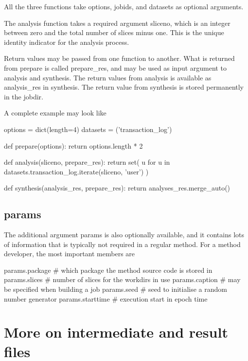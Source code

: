 All the three functions take options, jobids, and datasets as optional
arguments.

The analysis function takes a required argument sliceno, which is an
integer between zero and the total number of slices minus one.  This
is the unique identity indicator for the analysis process.

Return values may be passed from one function to another.  What is
returned from prepare is called prepare\_res, and may be used as input
argument to analysis and synthesis.  The return values from analysis
is available as analysis\_res in synthesis.  The return value from
synthesis is stored permanently in the jobdir.

A complete example may look like

\begin{python}
options = dict(length=4)
datasets = ('transaction_log')

def prepare(options):
  return options.length * 2

def analysis(sliceno, prepare_res):
  return set(
    u for u in datasets.transaction_log.iterate(sliceno, 'user')
  )

def synthesis(analysis_res, prepare_res):
   return analyses_res.merge_auto()
\end{python}


\subsection{params}
The additional argument params is also optionally available, and it
contains lots of information that is typically not required in a
regular method.  For a method developer, the most important members
are

\begin{python}
params.package     # which package the method source code is stored in
params.slices      # number of slices for the workdirs in use
params.caption     # may be specified when building a job
params.seed        # seed to initialise a random number generator
params.starttime   # execution start in epoch time
\end{python}



\newpage
\section{More on intermediate and result files}

